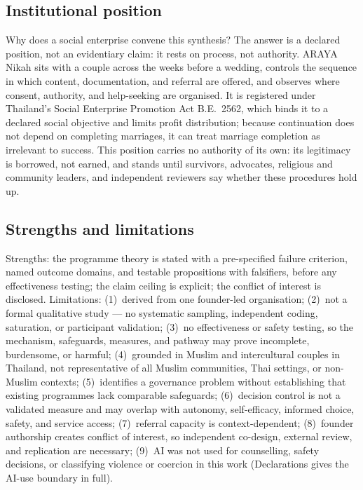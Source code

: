 \documentclass[11pt]{article}
\begin{document}
\subsection{Institutional position}
Why does a social enterprise convene this synthesis? The answer is a declared position, not an evidentiary claim: it rests on process, not authority. ARAYA Nikah sits with a couple across the weeks before a wedding, controls the sequence in which content, documentation, and referral are offered, and observes where consent, authority, and help-seeking are organised. It is registered under Thailand's Social Enterprise Promotion Act B.E.~2562, which binds it to a declared social objective and limits profit distribution; because continuation does not depend on completing marriages, it can treat marriage completion as irrelevant to success. This position carries no authority of its own: its legitimacy is borrowed, not earned, and stands until survivors, advocates, religious and community leaders, and independent reviewers say whether these procedures hold up.

\subsection{Strengths and limitations}
Strengths: the programme theory is stated with a pre-specified failure criterion, named outcome domains, and testable propositions with falsifiers, before any effectiveness testing; the claim ceiling is explicit; the conflict of interest is disclosed. Limitations: (1)~derived from one founder-led organisation; (2)~not a formal qualitative study --- no systematic sampling, independent coding, saturation, or participant validation; (3)~no effectiveness or safety testing, so the mechanism, safeguards, measures, and pathway may prove incomplete, burdensome, or harmful; (4)~grounded in Muslim and intercultural couples in Thailand, not representative of all Muslim communities, Thai settings, or non-Muslim contexts; (5)~identifies a governance problem without establishing that existing programmes lack comparable safeguards; (6)~decision control is not a validated measure and may overlap with autonomy, self-efficacy, informed choice, safety, and service access; (7)~referral capacity is context-dependent; (8)~founder authorship creates conflict of interest, so independent co-design, external review, and replication are necessary; (9)~AI was not used for counselling, safety decisions, or classifying violence or coercion in this work (Declarations gives the AI-use boundary in full).
\end{document}
